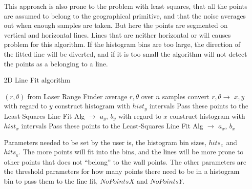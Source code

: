 This approach is also prone to the problem with least squares, that all the points are
assumed to belong to the geographical primitive, and that the noise averages out when
enough samples are taken. But here the points are segmented on vertical and horizontal
lines. Lines that are neither horizontal or will causes problem for this algorithm. If the
histogram bins are too large, the direction of the fitted line will be diverted, and if it
is too small the algorithm will not detect the points as a belonging to a line. 
\begin{algorithm}[htbp]
    \caption{2D Line Fit algorithm}
    \label{chap5:alg-2dlinefit}
    \begin{algorithmic}
        \REQUIRE $(r, \theta)$ from Laser Range Finder
        \STATE average $r, \theta$ over $n$ samples
        \STATE convert $r, \theta \rightarrow$ $x, y$ 
        \STATE with regard to $y$ construct histogram with $hist_y$ intervals
                \STATE Pass these points to the Least-Squares Line Fit Alg $\rightarrow$ $a_y$, $b_y$
            \ENDIF
        \ENDFOR
        \STATE with regard to $x$ construct histogram with $hist_x$ intervals
                \STATE Pass these points to the Least-Squares Line Fit Alg $\rightarrow$ $a_x$, $b_x$
            \ENDIF
        \ENDFOR
    \end{algorithmic}
\end{algorithm}
Parameters needed to be set by the user is, the histogram bin sizes, $hits_x$ and
$hits_y$. The more points will fit into the bins, and the lines will be more prone to
other points that does not ``belong'' to the wall points. The other parameters are the
threshold parameters for how many points there need to be in a histogram bin to pass them
to the line fit, $NoPointsX$ and $NoPointsY$.


